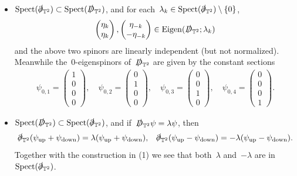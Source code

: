 \documentclass[11pt,final]{amsart}
\newcommand{\T}{\mathbb{T}}
\newcommand{\D}{\slashed{D}}
\newcommand{\pd}{\slashed{\partial}}
\newcommand{\braces}[1]{\left\{#1\right\}} %
\DeclareMathOperator{\Eigen}{Eigen}
\DeclareMathOperator{\Spect}{Spect}
\DeclareMathOperator{\up}{up}
\DeclareMathOperator{\down}{down}
\begin{document}
\begin{itemize}
    \item[(1)] $\Spect(\pd_{\T^2})\subset\Spect(\D_{\T^2})$, and for each~$\lambda_k\in\Spect(\pd_{\T^2})\setminus \braces{0}$,
    \begin{align}
        \begin{pmatrix} \eta_k \\ \eta_k \end{pmatrix}, 
        \begin{pmatrix} \eta_{-k} \\ -\eta_{-k} \end{pmatrix}
        \in \Eigen(\D_{\T^2};\lambda_k)
    \end{align}
    and the above two spinors are linearly independent (but not normalized).
    Meanwhile the~$0$-eigenspinors of~$\D_{\T^2}$ are given by the constant sections 
    \begin{align}
        \psi_{0,1}=\begin{pmatrix} 1 \\ 0 \\ 0 \\ 0 \end{pmatrix}, \quad 
        \psi_{0,2}=\begin{pmatrix} 0 \\ 1 \\ 0 \\ 0 \end{pmatrix}, \quad 
        \psi_{0,3}=\begin{pmatrix} 0 \\ 0 \\ 1 \\ 0 \end{pmatrix}, \quad 
        \psi_{0,4}=\begin{pmatrix} 0 \\ 0 \\ 0 \\ 1 \end{pmatrix}. 
    \end{align}

    \item[(2)] $\Spect(\D_{\T^2})\subset\Spect(\pd_{\T^2})$, and if~$\D_{\T^2}\psi=\lambda\psi$, then
    \begin{align}
        \pd_{\T^2}(\psi_{\up}+\psi_{\down}) = \lambda (\psi_{\up}+\psi_{\down}), & & 
        \pd_{\T^2}(\psi_{\up}-\psi_{\down}) =-\lambda (\psi_{\up}-\psi_{\down}).
    \end{align}
    Together with the construction in (1) we see that both~$\lambda$ and~$-\lambda$ are in~$\Spect(\pd_{\T^2})$. 
\end{itemize}
\end{document}
